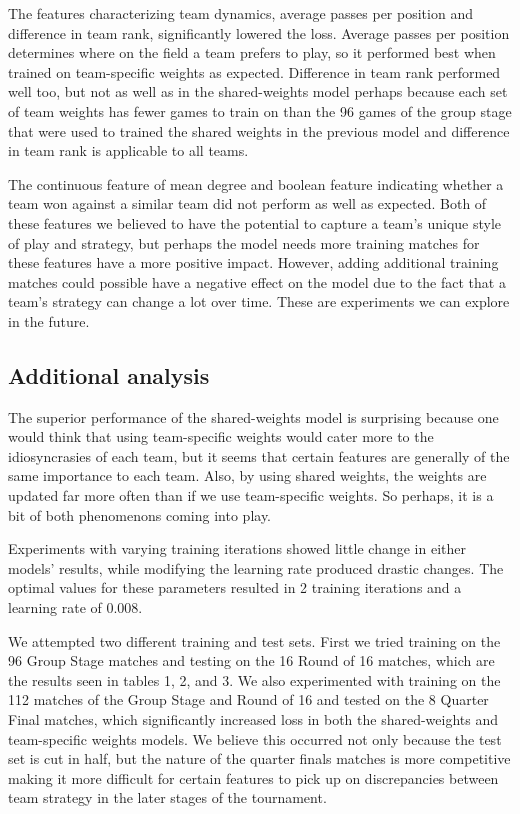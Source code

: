 \documentclass[11pt,letterpaper]{article}
\begin{document}
The features characterizing team dynamics, average passes per position and difference in team rank, significantly lowered the loss.  Average passes per position determines where on the field a team prefers to play, so it performed best when trained on team-specific weights as expected. Difference in team rank performed well too, but not as well as in the shared-weights model perhaps because each set of team weights has fewer games to train on than the 96 games of the group stage that were used to trained the shared weights in the previous model and difference in team rank is applicable to all teams.

The continuous feature of mean degree and boolean feature indicating whether a team won against a similar team did not perform as well as expected. Both of these features we believed to have the potential to capture a team's unique style of play and strategy, but perhaps the model needs more training matches for these features have a more positive impact.  However, adding additional training matches could possible have a negative effect on the model due to the fact that a team's strategy can change a lot over time.  These are experiments we can explore in the future.

\subsection{Additional analysis}


The superior performance of the shared-weights model is surprising because one would think that using team-specific weights would cater more to the idiosyncrasies of each team, but it seems that certain features are generally of the same importance to each team. Also, by using shared weights, the weights are updated far more often than if we use team-specific weights. So perhaps, it is a bit of both phenomenons coming into play.

Experiments with varying training iterations showed little change in either models' results, while modifying the learning rate produced drastic changes. The optimal values for these parameters resulted in 2 training iterations and a learning rate of 0.008.

We attempted two different training and test sets.  First we tried training on the 96 Group Stage matches and testing on the 16 Round of 16 matches, which are the results seen in tables 1, 2, and 3. We also experimented with training on the 112 matches of the Group Stage and Round of 16 and tested on the 8 Quarter Final matches, which significantly increased loss in both the shared-weights and team-specific weights models. We believe this occurred not only because the test set is cut in half, but the nature of the quarter finals matches is more competitive making it more difficult for certain features to pick up on discrepancies between team strategy in the later stages of the tournament. 
\end{document}
